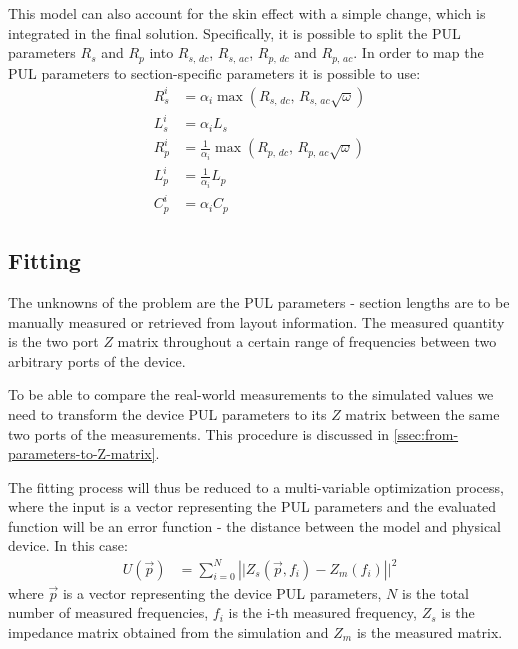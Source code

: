 This model can also account for the skin effect with a simple change, which is integrated in the final solution. Specifically, it is possible to split the PUL parameters $R_s$ and $R_p$ into $R_{s,\,dc}$, $R_{s,\,ac}$, $R_{p,\,dc}$ and $R_{p,\,ac}$. In order to map the PUL parameters to section-specific parameters it is possible to use:
\begin{align*}
    R^i_s &= \alpha_i \max\left(R_{s,\,dc},\, R_{s,\,ac}\sqrt{\omega}\right) \\
    L^i_s &= \alpha_i L_s \\
    R^i_p &= \frac{1}{\alpha_i} \max\left(R_{p,\,dc},\, R_{p,\,ac}\sqrt{\omega}\right) \\
    L^i_p &= \frac{1}{\alpha_i} L_p \\
    C^i_p &= \alpha_i C_p
\end{align*}

\subsection{Fitting}
\label{ssec:fitting}
The unknowns of the problem are the PUL parameters - section lengths are to be manually measured or retrieved from layout information. The measured quantity is the two port $Z$ matrix throughout a certain range of frequencies between two arbitrary ports of the device.

To be able to compare the real-world measurements to the simulated values we need to transform the device PUL parameters to its $Z$ matrix between the same two ports of the measurements. This procedure is discussed in \autoref{ssec:from-parameters-to-Z-matrix}.

The fitting process will thus be reduced to a multi-variable optimization process, where the input is a vector representing the PUL parameters and the evaluated function will be an error function - the distance between the model and physical device. In this case:
\begin{align*}
    U\left(\vec{p}\right) &= \sum_{i = 0}^N \left|| Z_s\left(\vec{p}, f_i\right) - Z_m(f_i) \right|| ^2
\end{align*}
where $\vec{p}$ is a vector representing the device PUL parameters, $N$ is the total number of measured frequencies, $f_i$ is the i-th measured frequency, $Z_s$ is the impedance matrix obtained from the simulation and $Z_m$ is the measured matrix.

